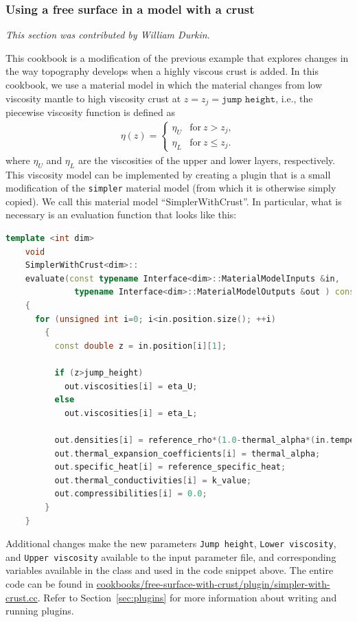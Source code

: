 \documentclass{article}
\begin{document}
\subsubsection{Using a free surface in a model with a crust}
\label{sec:cookbooks-freesurfaceWC}

\textit{This section was contributed by William Durkin}.

This cookbook is a modification of the previous example that explores changes in the way topography develops when a 
highly viscous crust is added.  
In this cookbook, we use a material model in which the material changes from low
viscosity mantle to high viscosity crust at $z = z_j = \texttt{jump height}$,
i.e., the piecewise viscosity function is defined as
\begin{align*}
  \eta(z) = \left\{
    \begin{matrix}
      \eta_U & \text{for}\ z > z_j, \\
      \eta_L & \text{for}\ z  \le z_j.
    \end{matrix}
  \right.
\end{align*}
where $\eta_U$ and $\eta_L$ are the viscosities of the upper and lower layers,
respectively. This viscosity model can be implemented by creating a plugin that
is a small modification of the \texttt{simpler} material model (from which it
is otherwise simply copied). We call this material model ``SimplerWithCrust''.
In particular, what is necessary is an evaluation function that looks like this:
\begin{lstlisting}[frame=single,language=C++] 
    template <int dim>
    void
    SimplerWithCrust<dim>::
    evaluate(const typename Interface<dim>::MaterialModelInputs &in, 
              typename Interface<dim>::MaterialModelOutputs &out ) const
    {
      for (unsigned int i=0; i<in.position.size(); ++i)
        { 
          const double z = in.position[i][1];

          if (z>jump_height)
            out.viscosities[i] = eta_U;
          else
            out.viscosities[i] = eta_L;
                     
          out.densities[i] = reference_rho*(1.0-thermal_alpha*(in.temperature[i]-reference_T));
          out.thermal_expansion_coefficients[i] = thermal_alpha;
          out.specific_heat[i] = reference_specific_heat;
          out.thermal_conductivities[i] = k_value;
          out.compressibilities[i] = 0.0;
        }
    }
\end{lstlisting}
Additional changes make the new parameters \texttt{Jump height}, \texttt{Lower
viscosity}, and \texttt{Upper viscosity} available to the input parameter file,
and corresponding variables available in the class and used in the code snippet
above. The entire code can be found in
\url{cookbooks/free-surface-with-crust/plugin/simpler-with-crust.cc}. Refer to
Section~\ref{sec:plugins} for more information about writing and running
plugins.
\end{document}
